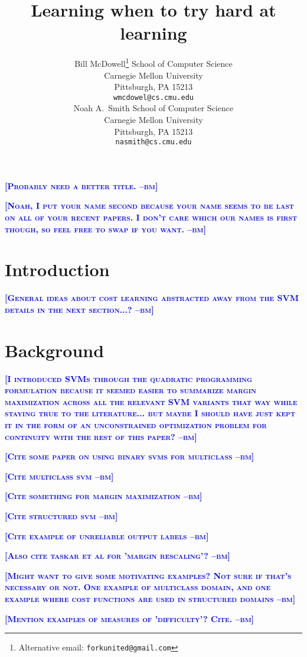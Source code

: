 \documentclass{article} %
\title{Learning when to try hard at learning}
\author{
Bill McDowell\thanks{Alternative email: \texttt{forkunited@gmail.com}}
School of Computer Science\\
Carnegie Mellon University\\
Pittsburgh, PA 15213 \\
\texttt{wmcdowel@cs.cmu.edu} \\
\And
Noah A.~Smith
School of Computer Science\\
Carnegie Mellon University\\
Pittsburgh, PA 15213 \\
\texttt{nasmith@cs.cmu.edu} \\
}
\newcommand{\bmcomment}[1]{\textcolor{blue}{\textsc{\textbf{[#1 --bm]}}}}
\begin{document}
\maketitle

\bmcomment{Probably need a better title.}

\bmcomment{Noah, I put your name second because your name seems 
to be last on all of your recent papers.  I don't care which our names is
first though, so feel free to swap if you want.}

\begin{abstract}
\end{abstract}

\section{Introduction}

\bmcomment{General ideas about cost learning abstracted away
from the SVM details in the next section...?}

\section{Background}

\bmcomment{I introduced SVMs through the quadratic programming
formulation because it seemed easier to summarize margin maximization
across all the relevant SVM variants that way while staying true to the literature... 
but maybe I should have just kept it in the form
of an unconstrained optimization problem for continuity with the rest
of this paper?}

\bmcomment{Cite some paper on using binary svms for multiclass}

\bmcomment{Cite multiclass svm}

\bmcomment{Cite something for margin maximization}

\bmcomment{Cite structured svm}

\bmcomment{Cite example of unreliable output labels}

\bmcomment{Also cite taskar et al for 'margin rescaling'?}

\bmcomment{Might want to give some motivating examples? Not sure if that's
necessary or not. One example of multiclass domain, and one example where
cost functions are used in structured domains}

\bmcomment{Mention examples of measures of 'difficulty'? Cite.}
\end{document}
